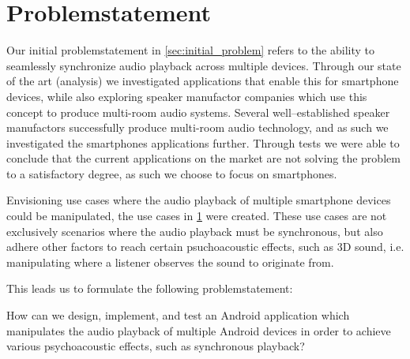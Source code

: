 \chapter{Problemstatement}
Our initial problemstatement in \cref{sec:initial_problem} refers to the ability to seamlessly synchronize audio playback across multiple devices.
Through our state of the art (analysis) we investigated applications that enable this for smartphone devices, while also exploring speaker manufactor companies which use this concept to produce multi-room audio systems.
Several well--established speaker manufactors successfully produce multi-room audio technology, and as such we investigated the smartphones applications further.
Through tests we were able to conclude that the current applications on the market are not solving the problem to a satisfactory degree, as such we choose to focus on smartphones.

Envisioning use cases where the audio playback of multiple smartphone devices could be manipulated, the use cases in \cref{} were created.
These use cases are not exclusively scenarios where the audio playback must be synchronous, but also adhere other factors to reach certain psuchoacoustic effects, such as 3D sound, i.e. manipulating where a listener observes the sound to originate from.

This leads us to formulate the following problemstatement:

\begin{problemstatement}
    How can we design, implement, and test an Android application which manipulates the audio playback of multiple Android devices in order to achieve various psychoacoustic effects, such as synchronous playback?
\end{problemstatement}
